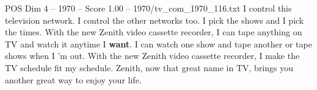 \begin{textsample}{POS Dim 4 – 1970 – Score 1.00 – 1970/tv\_com\_1970\_116.txt}  \label{ex:f4_pos_036}
I control this television network.
I control the other networks too.
I pick the shows and I pick the times.
With the new Zenith video cassette recorder, I can tape anything on TV and watch it anytime I \textbf{want}.
I can watch one show and tape another or tape shows when I 'm out.
With the new Zenith video cassette recorder, I make the TV schedule fit my schedule.
Zenith, now that great name in TV, brings you another great way to enjoy your life.

\end{textsample}
